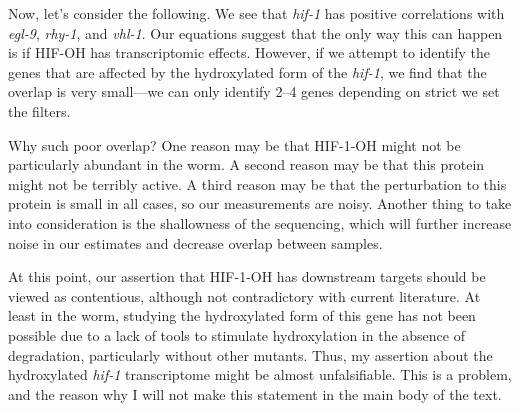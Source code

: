 \documentclass{article}
\newcommand{\gene}[1]{\textrm{\emph{#1}}}
\newcommand{\protein}[1]{\textrm{#1}}
\theoremstyle{definition}
\begin{document}
Now, let's consider the following. We see that \gene{hif-1} has positive correlations with \gene{egl-9}, \gene{rhy-1}, and \gene{vhl-1}. Our equations suggest that the only way this can happen is if \protein{HIF-OH} has transcriptomic effects. However, if we attempt to identify the genes that are affected by the hydroxylated form of the \gene{hif-1}, we find that the overlap is very small---we can only identify 2--4 genes depending on strict we set the filters.

Why such poor overlap? One reason may be that \protein{HIF-1-OH} might not be particularly abundant in the worm. A second reason may be that this protein might not be terribly active. A third reason may be that the perturbation to this protein is small in all cases, so our measurements are noisy. Another thing to take into consideration is the shallowness of the sequencing, which will further increase noise in our estimates and decrease overlap between samples.

At this point, our assertion that \protein{HIF-1-OH} has downstream targets should be viewed as contentious, although not contradictory with current literature. At least in the worm, studying the hydroxylated form of this gene has not been possible due to a lack of tools to stimulate hydroxylation in the absence of degradation, particularly without other mutants. Thus, my assertion about the hydroxylated \gene{hif-1} transcriptome might be almost unfalsifiable. This is a problem, and the reason why I will not make this statement in the main body of the text.
\end{document}
